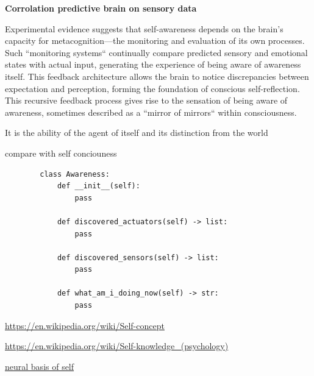 \documentclass{book}
\providecommand{\ProjectDeepHeading}[2]{%
    \par\medskip\noindent\textbf{#2}\par\smallskip
}
\begin{document}
    \ProjectDeepHeading{7}{Corrolation predictive brain on sensory data}
    Experimental evidence suggests that self-awareness depends on the brain's capacity for metacognition—the monitoring and evaluation of its own processes. Such ``monitoring systems`` continually compare predicted sensory and emotional states with actual input, generating the experience of being aware of awareness itself. This feedback architecture allows the brain to notice discrepancies between expectation and perception, forming the foundation of conscious self-reflection. This recursive feedback process gives rise to the sensation of being aware of awareness, sometimes described as a ``mirror of mirrors`` within consciousness.\cite{garcia-2013-stuck-in-the-moment}


    
    It is the ability of the agent of itself and its distinction from the world
    
    compare with self conciouness
    \begin{verbatim}
        class Awareness:
            def __init__(self):
                pass
            
            def discovered_actuators(self) -> list:
                pass
            
            def discovered_sensors(self) -> list:
                pass
            
            def what_am_i_doing_now(self) -> str:
                pass
    \end{verbatim}


\url{https://en.wikipedia.org/wiki/Self-concept}


\url{https://en.wikipedia.org/wiki/Self-knowledge_(psychology)}


\href{https://en.wikipedia.org/wiki/Neural_basis_of_self}{neural basis of self}

\end{document}
